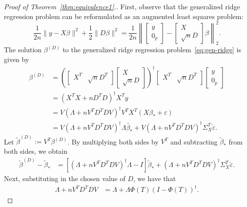 \documentclass[11pt]{article}
\begin{document}
\begin{proof}[Proof of Theorem~\ref{thm:equivalence1}.]
First, observe that the generalized ridge regression problem can be reformulated as an augmented least squares problem:
\[
    \frac{1}{2n}\|y - X \beta\|^2 + \frac{1}{2}\| D \beta \|^2 = \frac{1}{2n}\left\|\begin{bmatrix} y \\ 0_p \end{bmatrix} - \begin{bmatrix} X \\ \sqrt{n}D \end{bmatrix} \beta \right\|_2^2.
\]
The solution $\beta^{(D)}$ to the generalized ridge regression problem~\eqref{eq:gen-ridge} is given by
\begin{align*}
   \beta^{(D)}
   &= \left( \begin{bmatrix} X^T & \sqrt{n} D^T \end{bmatrix} \begin{bmatrix} X \\ \sqrt{n} D \end{bmatrix}\right)^{\dagger}  \begin{bmatrix} X^T & \sqrt{n} D^T \end{bmatrix} \begin{bmatrix} y \\ 0_p \end{bmatrix} \\
   &= \left(X^TX + n D^T D \right)^{\dagger}  X^T y \\
   &= V\left(\Lambda + n V^T D^T D V \right)^{\dagger}  V^T X^T(X\beta_* + \varepsilon) \\
   &= V\left(\Lambda + n V^T D^T D V \right)^{\dagger}  \Lambda \tilde{\beta_*} + V\left(\Lambda + n V^T D^T D V \right)^{\dagger}  \Sigma_X^T \check{\varepsilon}.
\end{align*}
Let $\tilde{\beta}^{(D)} := V^T \beta^{(D)}$.
By multiplying both sides by $V^T$ and subtracting $\tilde{\beta}_*$ from both sides, we obtain
\begin{align*}
       \tilde{\beta}^{(D)} - \tilde{\beta}_*
       &= \left [\left(\Lambda + n V^T D^T D V \right)^{\dagger}  \Lambda - I \right] \tilde{\beta}_* + \left(\Lambda + n V^T D^T D V \right)^{\dagger} \Sigma_X^T \check{\varepsilon}.
\end{align*}
Next, substituting in the chosen value of $D$, we have that
\begin{align*}
    \Lambda + n V^T D^T D V
    &= \Lambda + \Lambda \Phi(T)(I-\Phi(T))^{\dagger} .

\end{align*}
\end{proof}
\end{document}
